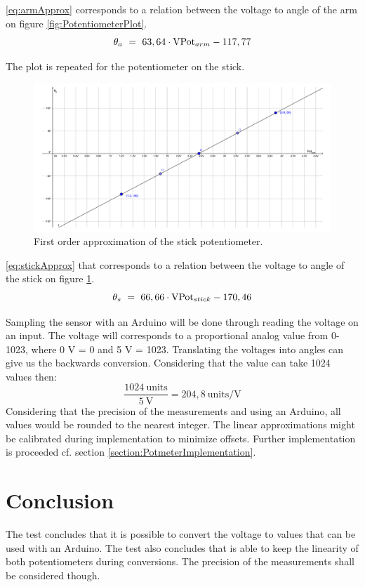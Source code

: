 \autoref{eq:armApprox} corresponds to a relation between the voltage to angle of the arm on figure \ref{fig:PotentiometerPlot}.
\begin{equation}\label{eq:armApprox}
\theta_a\ =\ 63,64 \cdot \text{VPot}_{arm} - 117,77 \addunit{\radian}
\end{equation}


The plot is repeated for the potentiometer on the stick.
\begin{figure}[htbp]  
\hspace*{-3cm}
\centering
\includegraphics[width=0.9\paperwidth]{figures/appendix/PotentiometerPlotStick.pdf}
\caption{First order approximation of the stick potentiometer.}
\label{fig:PotentiometerPlotStick}
\end{figure}

\autoref{eq:stickApprox} that corresponds to a relation between the voltage to angle of the stick on figure \ref{fig:PotentiometerPlotStick}.
\begin{equation}\label{eq:stickApprox}
\theta_s\ =\ 66,66 \cdot \text{VPot}_{stick} - 170,46 \addunit{\radian}
\end{equation}

Sampling the sensor with an Arduino will be done through reading the voltage on an input. The voltage will corresponds to a proportional analog value from 0-1023, where 0 V = 0 and 5 V = 1023. Translating the voltages into angles can give us the backwards conversion. Considering that the value can take 1024 values then:
\begin{equation}
\dfrac{1024\ \text{units}}{5\ \text{V}} = 204,8\ \text{units/V}
\end{equation}     
Considering that the precision of the measurements and using an Arduino, all values would be rounded to the nearest integer.
The linear approximations might be calibrated during implementation to minimize offsets.
Further implementation is proceeded cf. section \ref{section:PotmeterImplementation}.

\section*{Conclusion}
The test concludes that it is possible to convert the voltage to values that can be used with an Arduino. The test also concludes that is able to keep the linearity of both potentiometers during conversions. The precision of the measurements shall be considered though. 


